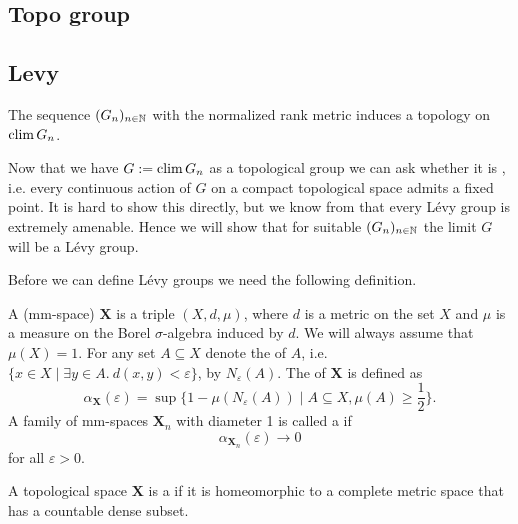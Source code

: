 \subsection*{Topo group}
\subsection*{Levy}




\begin{lemma}\label{lem:GroupTopo}
The sequence $(G_n)_{n\in\mathbb{N}}$ with the normalized rank metric induces a topology on $\operatorname{clim} G_n$.
\end{lemma}

Now that we have $G:=\operatorname{clim} G_n$ as a topological group we can ask whether it is , i.e. every continuous action of $G$ on a compact topological space admits a fixed point. It is hard to show this directly, but we know from \cite{Levy} that every L\'evy group is extremely amenable. Hence we will show that for suitable $(G_n)_{n\in\mathbb{N}}$ the limit $G$ will be a L\'evy group.

Before we can define L\'evy groups we need the following definition.
\begin{definition}
A  (mm-space) $\boldsymbol{X}$ is a triple $(X,d,\mu)$, where $d$ is a metric on the set $X$ and $\mu$ is a measure on the Borel $\sigma$-algebra induced by $d$. We will always assume that $\mu(X)=1$. 
For any set $A\subseteq X$ denote the  of $A$, i.e. $\{x\in X\mid\exists y\in A.\  d(x,y)<\varepsilon\}$, by $N_\varepsilon(A)$.%
The  of $\boldsymbol{X}$ is defined as 
\[\alpha_{\boldsymbol{X}}(\varepsilon)=\sup\{1-\mu(N_\varepsilon(A))\mid A\subseteq X, \mu(A)\geq\frac{1}{2}\}.\]
A family of mm-spaces $\boldsymbol{X}_n$ with diameter 1 is called a  if 
\[\alpha_{\boldsymbol{X}_n}(\varepsilon)\to 0\]
for all $\varepsilon>0$.

A topological space $\boldsymbol{X}$ is a  if it is homeomorphic to a complete metric space that has a countable dense subset.
\end{definition}

